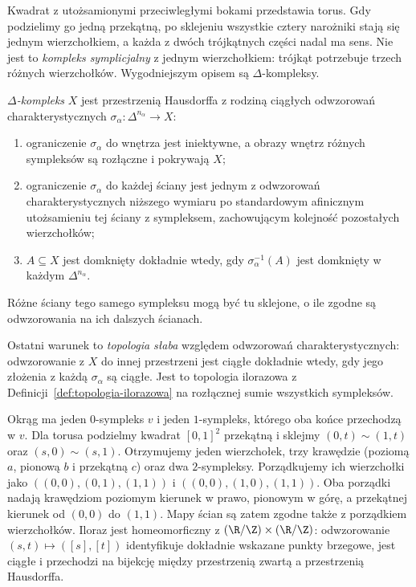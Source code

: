 \begin{uwaga}
\label{uwaga:delta-motywacja}
Kwadrat z utożsamionymi przeciwległymi
bokami przedstawia torus. Gdy podzielimy
go jedną przekątną, po sklejeniu wszystkie
cztery narożniki stają się jednym
wierzchołkiem, a każda z dwóch
trójkątnych części nadal ma sens.
Nie jest to \emph{kompleks symplicjalny}
z jednym wierzchołkiem: trójkąt
potrzebuje trzech różnych wierzchołków.
Wygodniejszym opisem są
$\Delta$-kompleksy.
\end{uwaga}

\begin{definicja}
\label{def:delta-kompleks}
\emph{$\Delta$-kompleks} $X$ jest
przestrzenią Hausdorffa z rodziną ciągłych odwzorowań charakterystycznych
$\sigma_\alpha:\Delta^{n_\alpha}\to X$:
\begin{enumerate}[label=(\roman*),leftmargin=*]
\item ograniczenie $\sigma_\alpha$ do wnętrza
      jest iniektywne, a obrazy wnętrz
      różnych sympleksów są rozłączne
      i pokrywają $X$;
\item ograniczenie $\sigma_\alpha$ do każdej
      ściany jest jednym z odwzorowań
      charakterystycznych niższego wymiaru
      po standardowym afinicznym
      utożsamieniu tej ściany z sympleksem, zachowującym
      kolejność pozostałych wierzchołków;
\item $A\subseteq X$ jest domknięty dokładnie
      wtedy, gdy $\sigma_\alpha^{-1}(A)$
      jest domknięty w każdym
      $\Delta^{n_\alpha}$.
\end{enumerate}
Różne ściany tego samego sympleksu
mogą być tu sklejone, o ile zgodne
są odwzorowania na ich dalszych ścianach.
\end{definicja}

Ostatni warunek to \emph{topologia słaba}
względem odwzorowań charakterystycznych:
odwzorowanie z $X$ do innej przestrzeni
jest ciągłe dokładnie wtedy, gdy jego
złożenia z każdą $\sigma_\alpha$ są ciągłe.
Jest to topologia ilorazowa z
Definicji~\ref{def:topologia-ilorazowa}
na rozłącznej sumie wszystkich sympleksów.

\begin{przyklad}
\label{prz:delta-torus}
Okrąg ma jeden $0$-sympleks $v$
i jeden $1$-sympleks, którego oba końce
przechodzą w $v$. Dla torusa
podzielmy kwadrat $[0,1]^2$
przekątną i sklejmy
$(0,t)\sim(1,t)$ oraz
$(s,0)\sim(s,1)$. Otrzymujemy
jeden wierzchołek, trzy krawędzie
(poziomą $a$, pionową $b$ i przekątną
$c$) oraz dwa $2$-sympleksy. Porządkujemy ich wierzchołki jako
$((0,0),(0,1),(1,1))$ i $((0,0),(1,0),(1,1))$.
Oba porządki nadają krawędziom poziomym kierunek w prawo,
pionowym w górę, a przekątnej kierunek od $(0,0)$ do $(1,1)$.
Mapy ścian są zatem zgodne także z porządkiem wierzchołków.
Iloraz jest homeomorficzny z
$(\R/\Z)\times(\R/\Z)$:
odwzorowanie $(s,t)\mapsto([s],[t])$
identyfikuje dokładnie wskazane
punkty brzegowe, jest ciągłe
i przechodzi na bijekcję
między przestrzenią zwartą
a przestrzenią Hausdorffa.
\end{przyklad}

